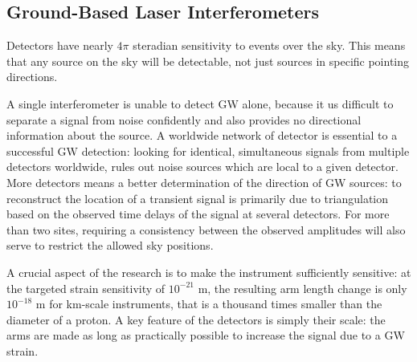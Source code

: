 \documentclass[binding=0.6cm, LaM]{sapthesis}
\begin{document}
\subsection{Ground-Based Laser Interferometers}

	Detectors have nearly $4\pi$ steradian sensitivity to events over the sky. 
	This means that any source on the sky will be detectable,
        not just sources in specific pointing directions.

	A single interferometer is unable to detect GW alone,
	because it us difficult to separate a signal from noise confidently 
	and also provides no directional information about the source.
	A worldwide network of detector is essential to a successful GW detection:
	looking for identical, simultaneous signals from multiple detectors worldwide, 
	rules out noise sources which are local to a given detector. 
	More detectors means a better determination of the direction of GW sources: 
	to reconstruct the location of a transient signal is primarily due to triangulation 
	based on the observed time delays of the signal at several detectors. 
	For more than two sites, requiring a consistency between the observed amplitudes 
	will also serve to restrict the allowed sky positions\cite{12}.

	A crucial aspect of the research is to make the instrument sufficiently sensitive:
        at the targeted strain sensitivity of $10^{−21}$ m, the resulting arm length change is only $ 10^{-18}$ m for km-scale instruments, that is
        a thousand times smaller than the diameter of a proton.
        A key feature of the detectors is simply their scale:
        the arms are made as long as practically possible to increase the signal due to a GW strain.
\end{document}
